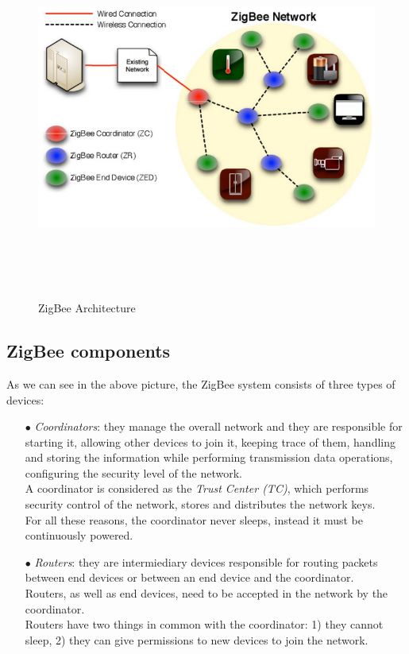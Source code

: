 \documentclass[12pt]{report}
\begin{document}
{{\begin{figure}[H]
\includegraphics[width=12cm,height=12cm,keepaspectratio]{zigbee_architecture}
\centering
\caption{ZigBee Architecture}
\end{figure}

\bigskip
\subsection{ZigBee components}
\bigskip

As we can see in the above picture, the ZigBee system consists of three types of devices:

\begin{itemize}
\setlength{\itemindent}{+4mm}
\item[$\bullet$] \emph{Coordinators}: they manage the overall network and they are responsible for starting it, allowing other devices to join it, keeping trace of them, handling and storing the information while performing transmission data operations, configuring the security level of the network.\\
A coordinator is considered as the \emph{Trust Center (TC)}, which performs security control of the network, stores and distributes the network keys.\\
For all these reasons, the coordinator never sleeps, instead it must be continuously powered.


\item[$\bullet$] \emph{Routers}: they are intermiediary devices responsible for routing packets between end devices or between an end device and the coordinator.\\
Routers, as well as end devices, need to be accepted in the network by the coordinator.\\
Routers have two things in common with the coordinator: 1) they cannot sleep, 2) they can give permissions to new devices to join the network.


\end{itemize}}}
\end{document}
